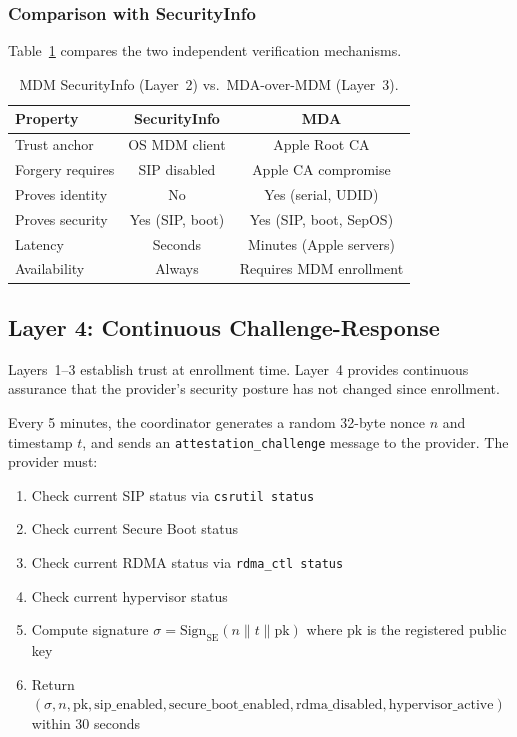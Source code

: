\documentclass[10pt,twocolumn,letterpaper]{article}
\begin{document}
\subsubsection{Comparison with SecurityInfo}

Table~\ref{tab:secinfo-vs-mda} compares the two independent verification mechanisms.

\begin{table}[h]
\centering
\caption{MDM SecurityInfo (Layer~2) vs.\ MDA-over-MDM (Layer~3).}
\vspace{4pt}
\small
\begin{tabular}{@{}lcc@{}}
\toprule
\textbf{Property} & \textbf{SecurityInfo} & \textbf{MDA} \\
\midrule
Trust anchor & OS MDM client & Apple Root CA \\
Forgery requires & SIP disabled & Apple CA compromise \\
Proves identity & No & Yes (serial, UDID) \\
Proves security & Yes (SIP, boot) & Yes (SIP, boot, SepOS) \\
Latency & Seconds & Minutes (Apple servers) \\
Availability & Always & Requires MDM enrollment \\
\bottomrule
\end{tabular}
\label{tab:secinfo-vs-mda}
\end{table}

\subsection{Layer 4: Continuous Challenge-Response}
\label{sec:challenge}

Layers~1--3 establish trust at enrollment time. Layer~4 provides continuous assurance that the provider's security posture has not changed since enrollment.

Every 5 minutes, the coordinator generates a random 32-byte nonce $n$ and timestamp $t$, and sends an \texttt{attestation\_challenge} message to the provider. The provider must:

\begin{enumerate}[leftmargin=*,itemsep=1pt]
    \item Check current SIP status via \texttt{csrutil status}
    \item Check current Secure Boot status
    \item Check current RDMA status via \texttt{rdma\_ctl status}
    \item Check current hypervisor status
    \item Compute signature $\sigma = \text{Sign}_{\text{SE}}(n \| t \| \text{pk})$ where $\text{pk}$ is the registered public key
    \item Return $(\sigma, n, \text{pk}, \text{sip\_enabled}, \text{secure\_boot\_enabled}, \text{rdma\_disabled}, \text{hypervisor\_active})$ within 30 seconds
\end{enumerate}
\end{document}
